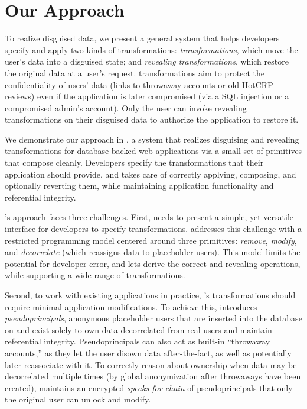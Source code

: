 \section{Our Approach}
%
To realize disguised data, we present a general system that helps developers
specify and apply two kinds of transformations: \emph{\xxing transformations},
which move the user's data into a disguised state; and \emph{revealing
transformations}, which restore the original data at a user’s request.
%
\Xxing transformations aim to protect the confidentiality of users' \xxed data
(\eg links to throwaway accounts or old HotCRP reviews) even if the application
is later compromised (\eg via a SQL injection or a compromised admin's account).
%
Only the user can invoke revealing transformations on their disguised data to
authorize the application to restore it.
%

%
We demonstrate our approach in \sys, a system that realizes disguising and
revealing transformations for database-backed web applications via a small set of
primitives that compose cleanly.
%
Developers specify the transformations that their application should provide,
and \sys takes care of correctly applying, composing, and optionally reverting
them, while maintaining application functionality and referential integrity.
%

\sys's approach faces three challenges.
First, \sys needs to present a simple, yet versatile interface for developers to
specify \xxing transformations.
%
\sys addresses this challenge with a restricted programming model centered
around three primitives: \emph{remove}, \emph{modify}, and \emph{decorrelate} (which reassigns data
to placeholder users).
%
This model limits the potential for developer error, and lets \sys derive the
correct \xxing and revealing operations, while supporting a wide range of
transformations.
%

%
Second, to work with existing applications in practice, \sys's \xxing
transformations should require minimal application modifications.
%
To achieve this, \sys introduces \emph{pseudoprincipals}, anonymous placeholder
users that are inserted into the database on \xxing and exist solely to own data
decorrelated from real users and maintain referential integrity.
%
Pseudoprincipals can also act as built-in ``throwaway accounts,'' as they let
the user disown data after-the-fact, as well as potentially later reassociate
with it.
%
To correctly reason about ownership when data may be decorrelated multiple times
(\eg by global anonymization after throwaways have been created), \sys maintains
an encrypted \emph{speaks-for chain} of pseudoprincipals that only the original user
can unlock and modify.
%

